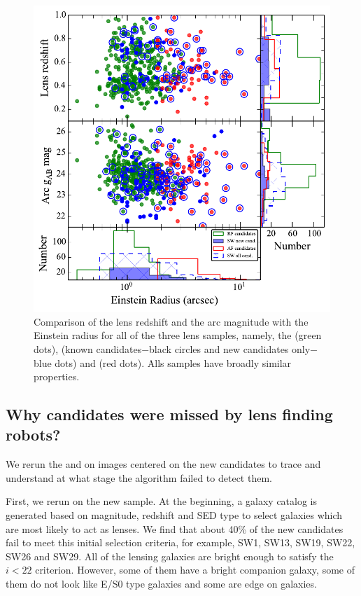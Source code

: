 \documentclass[useAMS,usenatbib,a4paper]{mn2e}
\begin{document}
\begin{figure}
\begin{center}
\includegraphics[scale=0.65]{sw-cfhtls-figs/zl_mg_re.pdf}
\caption{ \label{fig:zlmgre}
Comparison of the lens redshift and the arc magnitude with the
Einstein radius for all of the three lens samples, namely, the \rf (green dots),
\sw (known candidates$-$black circles and new candidates only$-$blue dots)
and \af (red dots). Alls samples have broadly similar properties.}
\end{center}
\end{figure}

\subsection{Why \sw candidates were missed by lens finding robots?}
We rerun the \rf and \af on images centered on the new \sw candidates to
trace and understand at what stage the algorithm failed to detect them.

First, we rerun \rf on the new \sw sample. At the beginning, a galaxy
catalog is generated based on magnitude, redshift and SED type
\citep[see]{Gavazzi2014} to select galaxies which are most likely to act
as lenses. We find that about 40\% of the new \sw candidates fail to
meet this initial selection criteria, for example, SW1, SW13, SW19, SW22, SW26
and SW29.  All of the lensing galaxies are bright enough to satisfy the
$i<22$ criterion. However, some of them have a bright companion galaxy,
some of them do not look like E/S0 type galaxies and some are edge on
galaxies.
\end{document}
